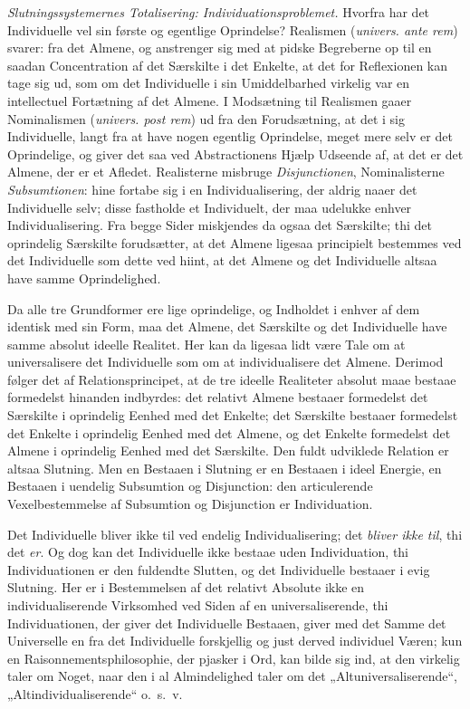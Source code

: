 \documentclass[12pt]{book}
\newcommand{\opage}[1]{\marginnote{\footnotesize\textit{[#1]}}}
\begin{document}
\emph{Slutningssystemernes Totalisering: Individuationsproblemet.} Hvorfra har det Individuelle vel sin første og egentlige Oprindelse? Realismen (\textit{univers. ante rem}) svarer: fra det Almene, og anstrenger sig med at pidske Begreberne op til en saadan Concentration af det Særskilte i det Enkelte, at det for Reflexionen kan tage sig ud, som om det Individuelle i sin Umiddelbarhed virkelig var en intellectuel Fortætning af det Almene. I Modsætning til Realismen gaaer Nominalismen (\textit{univers. post rem}) ud fra den Forudsætning, at det i sig Individuelle, langt fra at have nogen egentlig Oprindelse, meget mere selv er det Oprindelige, og giver det saa ved Abstractionens Hjælp Udseende af, at det er det Almene, der er et Afledet. Realisterne misbruge \emph{Disjunctionen}, Nominalisterne \emph{Subsumtionen}: hine fortabe sig i en Individualisering, der aldrig naaer det Individuelle selv; disse fastholde et Individuelt, der maa udelukke enhver Individualisering. Fra begge Sider miskjendes da ogsaa det
\opage{357}Særskilte; thi det oprindelig Særskilte forudsætter, at det Almene ligesaa principielt bestemmes ved det Individuelle som dette ved hiint, at det Almene og det Individuelle altsaa have samme Oprindelighed.

Da alle tre Grundformer ere lige oprindelige, og Indholdet i enhver af dem identisk med sin Form, maa det Almene, det Særskilte og det Individuelle have samme absolut ideelle Realitet. Her kan da ligesaa lidt være Tale om at universalisere det Individuelle som om at individualisere det Almene. Derimod følger det af Relationsprincipet, at de tre ideelle Realiteter absolut maae bestaae formedelst hinanden indbyrdes: det relativt Almene bestaaer formedelst det Særskilte i oprindelig Eenhed med det Enkelte; det Særskilte bestaaer formedelst det Enkelte i oprindelig Eenhed med det Almene, og det Enkelte formedelst det Almene i oprindelig Eenhed med det Særskilte. Den fuldt udviklede Relation er altsaa Slutning. Men en Bestaaen i Slutning er en Bestaaen i ideel Energie, en Bestaaen i uendelig Subsumtion og Disjunction: den articulerende Vexelbestemmelse af Subsumtion og Disjunction er Individuation.

Det Individuelle bliver ikke til ved endelig Individualisering; det \emph{bliver ikke til}, thi det \emph{er}. Og dog kan det Individuelle ikke bestaae uden Individuation, thi Individuationen er den fuldendte Slutten, og det Individuelle bestaaer i evig Slutning. Her er i Bestemmelsen af det relativt Absolute ikke en individualiserende Virksomhed ved Siden af en universaliserende, thi Individuationen, der giver det Individuelle Bestaaen, giver med det Samme det Universelle en fra det Individuelle forskjellig og just derved individuel Væren; kun en Raisonnementsphilosophie, der pjasker i Ord, kan bilde sig ind, at den virkelig taler om Noget, naar den i al Almindelighed taler om det „Altuniversaliserende“, „Altindividualiserende“ o.\ s.\ v.
\end{document}
